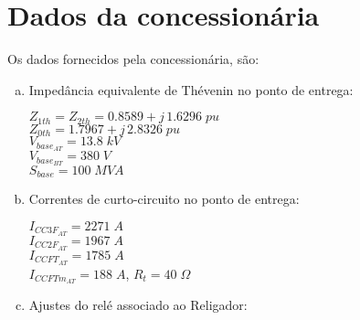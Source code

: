\section{Dados da concessionária}

Os dados fornecidos pela concessionária, são:

\begin{enumerate}[(a)]
    \item Impedância equivalente de Thévenin no ponto de entrega:
    
    $Z_{1th} = Z_{2th} = 0.8589 + j \, 1.6296 \; pu$ \\
    $Z_{0th} = 1.7967 + j \, 2.8326 \; pu$ \\
    $V_{base_{AT}} = 13.8 \; kV$ \\
    $V_{base_{BT}} = 380 \; V$ \\
    $S_{base} = 100 \; MVA$ 
    
    \item Correntes de curto-circuito no ponto de entrega:
    
    $I_{CC3F_{AT}} = 2271 \; A$ \\
    $I_{CC2F_{AT}} = 1967 \; A$ \\
    $I_{CCFT_{AT}} = 1785 \; A$ \\
    $I_{CCFTm_{AT}} = 188 \; A$, $R_t = 40 \; \Omega$ 
    
    \item Ajustes do relé associado ao Religador:
    

\end{enumerate}
